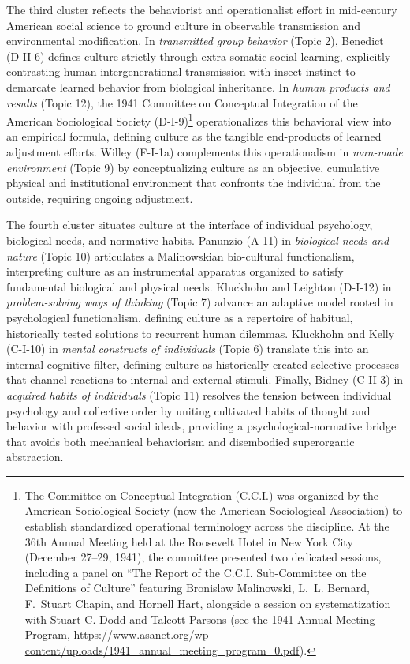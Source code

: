 \documentclass[11pt]{article}
\begin{document}
The third cluster reflects the behaviorist and operationalist effort in mid-century American social science to ground culture in observable transmission and environmental modification. In \emph{transmitted group behavior} (Topic 2), Benedict (D-II-6) defines culture strictly through extra-somatic social learning, explicitly contrasting human intergenerational transmission with insect instinct to demarcate learned behavior from biological inheritance. In \emph{human products and results} (Topic 12), the 1941 Committee on Conceptual Integration of the American Sociological Society (D-I-9)\footnote{The Committee on Conceptual Integration (C.C.I.) was organized by the American Sociological Society (now the American Sociological Association) to establish standardized operational terminology across the discipline. At the 36th Annual Meeting held at the Roosevelt Hotel in New York City (December 27--29, 1941), the committee presented two dedicated sessions, including a panel on ``The Report of the C.C.I. Sub-Committee on the Definitions of Culture'' featuring Bronislaw Malinowski, L.~L. Bernard, F.~Stuart Chapin, and Hornell Hart, alongside a session on systematization with Stuart C. Dodd and Talcott Parsons (see the 1941 Annual Meeting Program, \url{https://www.asanet.org/wp-content/uploads/1941_annual_meeting_program_0.pdf}).} operationalizes this behavioral view into an empirical formula, defining culture as the tangible end-products of learned adjustment efforts. Willey (F-I-1a) complements this operationalism in \emph{man-made environment} (Topic 9) by conceptualizing culture as an objective, cumulative physical and institutional environment that confronts the individual from the outside, requiring ongoing adjustment.

The fourth cluster situates culture at the interface of individual psychology, biological needs, and normative habits. Panunzio (A-11) in \emph{biological needs and nature} (Topic 10) articulates a Malinowskian bio-cultural functionalism, interpreting culture as an instrumental apparatus organized to satisfy fundamental biological and physical needs. Kluckhohn and Leighton (D-I-12) in \emph{problem-solving ways of thinking} (Topic 7) advance an adaptive model rooted in psychological functionalism, defining culture as a repertoire of habitual, historically tested solutions to recurrent human dilemmas. Kluckhohn and Kelly (C-I-10) in \emph{mental constructs of individuals} (Topic 6) translate this into an internal cognitive filter, defining culture as historically created selective processes that channel reactions to internal and external stimuli. Finally, Bidney (C-II-3) in \emph{acquired habits of individuals} (Topic 11) resolves the tension between individual psychology and collective order by uniting cultivated habits of thought and behavior with professed social ideals, providing a psychological-normative bridge that avoids both mechanical behaviorism and disembodied superorganic abstraction.
\end{document}
